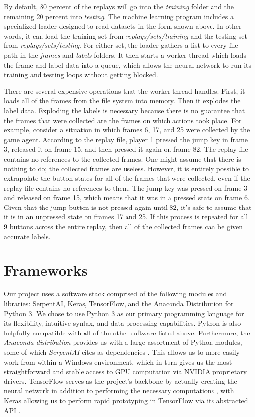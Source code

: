 By default, 80 percent of the replays will go into the \textit{training} folder and the remaining 20 percent into \textit{testing}. The machine learning program includes a specialized loader designed to read datasets in the form shown above. In other words, it can load the training set from \textit{replays/sets/training} and the testing set from \textit{replays/sets/testing}. For either set, the loader gathers a list to every file path in the \textit{frames} and \textit{labels} folders. It then starts a worker thread which loads the frame and label data into a queue, which allows the neural network to run its training and testing loops without getting blocked.

There are several expensive operations that the worker thread handles. First, it loads all of the frames from the file system into memory. Then it explodes the label data. Exploding the labels is necessary because there is no guarantee that the frames that were collected are the frames on which actions took place. For example, consider a situation in which frames 6, 17, and 25 were collected by the game agent. According to the replay file, player 1 pressed the jump key in frame 3, released it on frame 15, and then pressed it again on frame 82. The replay file contains no references to the collected frames. One might assume that there is nothing to do; the collected frames are useless. However, it is entirely possible to extrapolate the button states for all of the frames that were collected, even if the replay file contains no references to them. The jump key was pressed on frame 3 and released on frame 15, which means that it was in a pressed state on frame 6. Given that the jump button is not pressed again until 82, it's safe to assume that it is in an unpressed state on frames 17 and 25. If this process is repeated for all 9 buttons across the entire replay, then all of the collected frames can be given accurate labels.


\section{Frameworks}

Our project uses a software stack comprised of the following modules and libraries: SerpentAI, Keras, TensorFlow, and the Anaconda Distribution for Python 3. We chose to use Python 3 as our primary programming language for its flexibility, intuitive syntax, and data processing capabilities. Python is also helpfully compatible with all of the other software listed above. Furthermore, the {\it Anaconda distribution} provides us with a large assortment of Python modules, some of which {\it SerpentAI} cites as dependencies \cite{SerpentAI}. This allows us to more easily work from within a Windows environment, which in turn gives us the most straightforward and stable access to GPU computation via NVIDIA proprietary drivers. TensorFlow serves as the project's backbone by actually creating the neural network in addition to performing the necessary computations \cite{TensorFlow}, with Keras allowing us to perform rapid prototyping in TensorFlow via its abstracted API \cite{Keras}.

